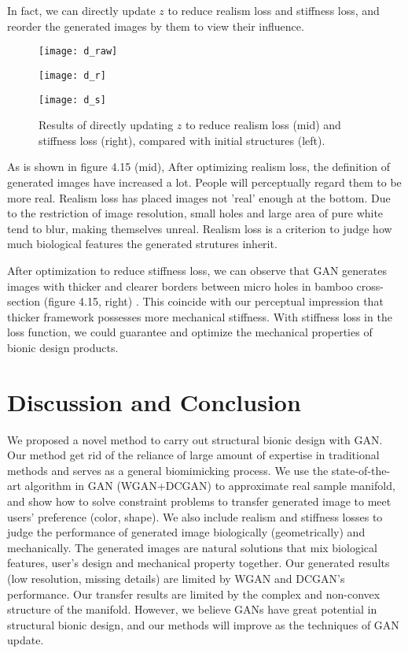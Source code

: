 In fact, we can directly update $z$ to reduce realism loss and stiffness loss, and reorder the generated images by them to view their influence.



\begin{figure}[htbp]
	\centering
	\begin{minipage}[t]{0.32\textwidth}
		\centering
		\texttt{[image: d\_raw]}

	\end{minipage}
	\begin{minipage}[t]{0.32\textwidth}
		\centering
		\texttt{[image: d\_r]}

	\end{minipage}
	\begin{minipage}[t]{0.32\textwidth}
	\centering
	\texttt{[image: d\_s]}

\end{minipage}
	\caption{Results of directly updating $z$ to reduce realism loss (mid) and stiffness loss (right), compared with initial structures (left).}
\end{figure}


As is shown in figure 4.15 (mid), After optimizing realism loss, the definition of generated images have increased a lot. People will perceptually regard them to be more real. Realism loss has placed images not 'real' enough at the bottom. Due to the restriction of image resolution, small holes and large area of pure white tend to blur, making themselves unreal. Realism loss is a criterion to judge how much biological features the generated strutures inherit.

After optimization to reduce stiffness loss, we can observe that GAN generates images with thicker and clearer borders between micro holes in bamboo cross-section (figure 4.15, right) . This coincide with our perceptual impression that thicker framework possesses more mechanical stiffness. With stiffness loss in the loss function, we could guarantee and optimize the mechanical properties of bionic design products. 

\section{Discussion and Conclusion}
We proposed a novel method to carry out structural bionic design with GAN. Our method get rid of the reliance of large amount of expertise in traditional methods and serves as a general biomimicking process. We use the state-of-the-art algorithm in GAN (WGAN+DCGAN) to approximate real sample manifold, and show how to solve constraint problems to transfer generated image to meet users’ preference (color, shape). We also include realism and stiffness losses to judge the performance of generated image biologically (geometrically) and mechanically. The generated images are natural solutions that mix biological features, user’s design and mechanical property together. Our generated results (low resolution, missing details) are limited by WGAN and DCGAN’s performance. Our transfer results are limited by the complex and non-convex structure of the manifold. However, we believe GANs have great potential in structural bionic design, and our methods will improve as the techniques of GAN update.